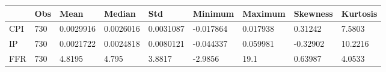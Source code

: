 \begin{tabular}{lllllllll}
\toprule 
& Obs & Mean & Median & Std & Minimum & Maximum & Skewness & Kurtosis \\ 
\midrule 
CPI & 730 & 0.0029916 & 0.0026016 & 0.0031087 & -0.017864 & 0.017938 & 0.31242 & 7.5803 \\ 
IP & 730 & 0.0021722 & 0.0024818 & 0.0080121 & -0.044337 & 0.059981 & -0.32902 & 10.2216 \\ 
FFR & 730 & 4.8195 & 4.795 & 3.8817 & -2.9856 & 19.1 & 0.63987 & 4.0533 \\ 
\bottomrule 
\end{tabular}